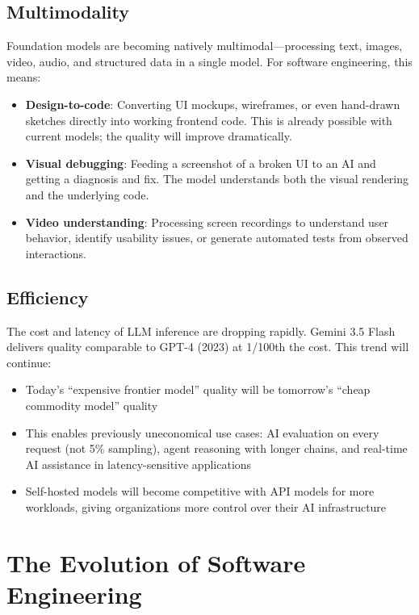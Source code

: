 \subsection{Multimodality}

Foundation models are becoming natively multimodal---processing text, images, video, audio, and structured data in a single model. For software engineering, this means:

\begin{itemize}[leftmargin=*]
    \item \textbf{Design-to-code}: Converting UI mockups, wireframes, or even hand-drawn sketches directly into working frontend code. This is already possible with current models; the quality will improve dramatically.
    \item \textbf{Visual debugging}: Feeding a screenshot of a broken UI to an AI and getting a diagnosis and fix. The model understands both the visual rendering and the underlying code.
    \item \textbf{Video understanding}: Processing screen recordings to understand user behavior, identify usability issues, or generate automated tests from observed interactions.
\end{itemize}

\subsection{Efficiency}

The cost and latency of LLM inference are dropping rapidly. Gemini 3.5 Flash delivers quality comparable to GPT-4 (2023) at 1/100th the cost. This trend will continue:

\begin{itemize}[leftmargin=*]
    \item Today's ``expensive frontier model'' quality will be tomorrow's ``cheap commodity model'' quality
    \item This enables previously uneconomical use cases: AI evaluation on every request (not 5\% sampling), agent reasoning with longer chains, and real-time AI assistance in latency-sensitive applications
    \item Self-hosted models will become competitive with API models for more workloads, giving organizations more control over their AI infrastructure
\end{itemize}


\section{The Evolution of Software Engineering}

